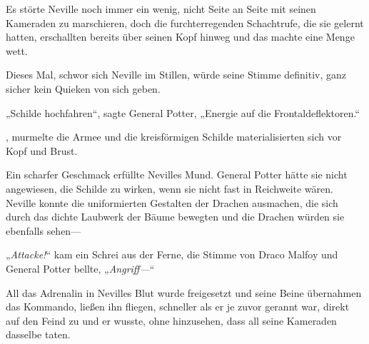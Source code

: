 Es störte Neville noch immer ein wenig, nicht Seite an Seite mit seinen Kameraden zu marschieren, doch die furchterregenden Schachtrufe, die sie gelernt hatten, erschallten bereits über seinen Kopf hinweg und das machte eine Menge wett.

Dieses Mal, schwor sich Neville im Stillen, würde seine Stimme definitiv, ganz sicher kein Quieken von sich geben.

„Schilde hochfahren“, sagte General Potter,
„Energie auf die Frontaldeflektoren.“

, murmelte die Armee und die kreisförmigen Schilde materialisierten sich vor Kopf und Brust.

Ein scharfer Geschmack erfüllte Nevilles Mund. General Potter hätte sie nicht angewiesen, die Schilde zu wirken, wenn sie nicht fast in Reichweite wären. Neville konnte die uniformierten Gestalten der Drachen ausmachen, die sich durch das dichte Laubwerk der Bäume bewegten und die Drachen würden sie ebenfalls sehen—

„\emph{Attacke!}“ kam ein Schrei aus der Ferne, die Stimme von Draco Malfoy und General Potter bellte, „\emph{Angriff—}“

All das Adrenalin in Nevilles Blut wurde freigesetzt und seine Beine übernahmen das Kommando, ließen ihn fliegen, schneller als er je zuvor gerannt war, direkt auf den Feind zu und er wusste, ohne hinzusehen, dass all seine Kameraden dasselbe taten.

